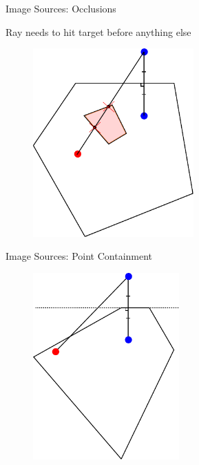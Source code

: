 \documentclass{beamer}
\begin{document}
\begin{frame}{Image Sources: Occlusions}

Ray needs to hit target before anything else

\begin{figure}[t]
	\centering
    \includegraphics[width=0.55\textwidth]{ImageSourcesOcclusions2.pdf}
\end{figure}



\end{frame}


\begin{frame}{Image Sources: Point Containment}

\begin{figure}[t]
	\centering
    \includegraphics[width=0.5\textwidth]{ImageSourcesInsideSegment.pdf}
\end{figure}

\end{frame}
\end{document}
